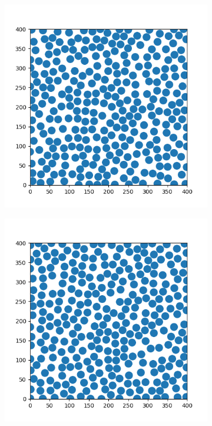 \documentclass{article}
\begin{document}
\begin{figure}[h]
	\centering
	\begin{subfigure}[t]{0.30\linewidth}
		\centering
		\includegraphics[width = 1.0\linewidth, trim={20 20 20 40}, clip=true]{plot_seq294.png}
		\label{fig:dminmax}	
	\end{subfigure}
	\hspace{0.16\linewidth}
	\begin{subfigure}[t]{0.30\linewidth}
		\centering
		\includegraphics[width = 1.0\linewidth, trim={20 20 20 40}, clip=true]{plot_bd302.png}
		\label{fig:bdmax}	
	\end{subfigure}
\label{fig:models}
\caption{}
\end{figure}
\end{document}

